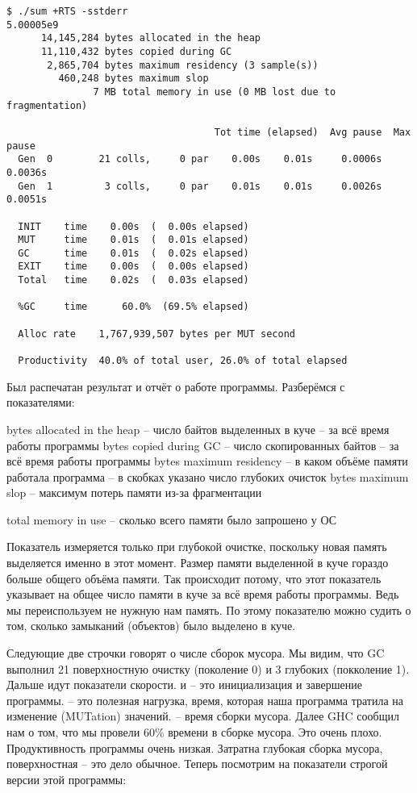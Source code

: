 \begin{verbatim}
$ ./sum +RTS -sstderr
5.00005e9
      14,145,284 bytes allocated in the heap
      11,110,432 bytes copied during GC
       2,865,704 bytes maximum residency (3 sample(s))
         460,248 bytes maximum slop
               7 MB total memory in use (0 MB lost due to fragmentation)

                                    Tot time (elapsed)  Avg pause  Max pause
  Gen  0        21 colls,     0 par    0.00s    0.01s     0.0006s    0.0036s
  Gen  1         3 colls,     0 par    0.01s    0.01s     0.0026s    0.0051s

  INIT    time    0.00s  (  0.00s elapsed)
  MUT     time    0.01s  (  0.01s elapsed)
  GC      time    0.01s  (  0.02s elapsed)
  EXIT    time    0.00s  (  0.00s elapsed)
  Total   time    0.02s  (  0.03s elapsed)

  %GC     time      60.0%  (69.5% elapsed)

  Alloc rate    1,767,939,507 bytes per MUT second

  Productivity  40.0% of total user, 26.0% of total elapsed
\end{verbatim}

Был распечатан результат и отчёт о работе программы. Разберёмся с
показателями:


\begin{code}
bytes allocated in the heap  -- число байтов выделенных в куче
                             -- за всё время работы программы
bytes copied during GC       -- число скопированных байтов
                             -- за всё время работы программы
bytes maximum residency      -- в каком объёме памяти работала программа 
                             -- в скобках указано число глубоких очисток
bytes maximum slop           -- максимум потерь памяти из-за фрагментации

total memory in use          -- сколько всего памяти было запрошено у ОС
\end{code}

Показатель  измеряется только при глубокой
очистке, поскольку новая память выделяется именно в этот момент. Размер
памяти выделенной в куче гораздо больше общего объёма памяти. Так
происходит потому, что этот показатель указывает на общее число памяти в
куче за всё время работы программы. Ведь мы переиспользуем не нужную нам
память. По этому показателю можно судить о том, сколько замыканий
(объектов) было выделено в куче.

Следующие две строчки говорят о числе сборок мусора. Мы видим, что GC
выполнил 21 поверхностную очистку (поколение 0) и 3 глубоких (покколение
1). Дальше идут показатели скорости.  и  -- это
инициализация и завершение программы.  -- это полезная нагрузка,
время, которая наша программа тратила на изменение (MUTation) значений.
 -- время сборки мусора. Далее GHC сообщил нам о том, что мы
провели 60\% времени в сборке мусора. Это очень плохо. Продуктивность
программы очень низкая. Затратна глубокая сборка мусора, поверхностная
-- это дело обычное. Теперь посмотрим на показатели строгой версии этой
программы:


